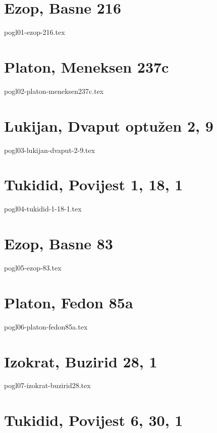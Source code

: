 \documentclass[a4paper,12pt,twoside]{report}
\begin{document}

\chapter{Ezop, Basne 216}

{pogl01-ezop-216.tex}


\chapter{Platon, Meneksen 237c}

{pogl02-platon-meneksen237c.tex}


\chapter{Lukijan, Dvaput optužen 2, 9}

{pogl03-lukijan-dvaput-2-9.tex}

\clearpage
\thispagestyle{empty}

\chapter{Tukidid, Povijest 1, 18, 1}

{pogl04-tukidid-1-18-1.tex}

\chapter{Ezop, Basne 83}

{pogl05-ezop-83.tex}

\clearpage
\thispagestyle{empty}

\chapter{Platon, Fedon 85a}

{pogl06-platon-fedon85a.tex}

\clearpage
\thispagestyle{empty}

\chapter{Izokrat, Buzirid 28, 1}

{pogl07-izokrat-buzirid28.tex}

\chapter{Tukidid, Povijest 6, 30, 1}
\end{document}
